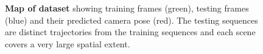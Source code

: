 \begin{figure}[t]
   \caption[Map of Cambridge Landmarks dataset.]{\textbf{Map of dataset} showing training frames (green), testing frames (blue) and their predicted camera pose (red). The testing sequences are distinct trajectories from the training sequences and each scene covers a very large spatial extent.}
   \label{fig:map}
\end{figure}







